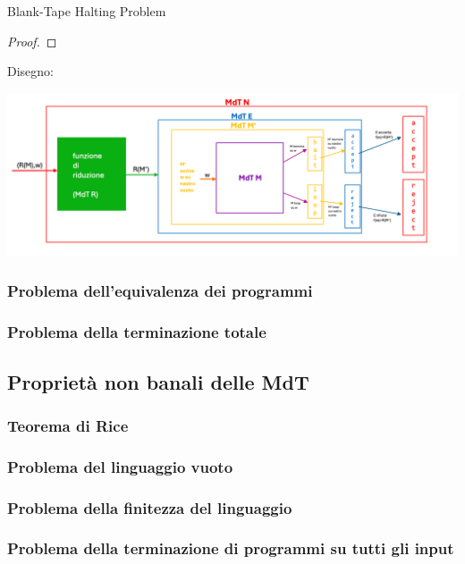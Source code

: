 \documentclass{article}  %
\theoremstyle{definition}
\begin{document}
\begin{theorem}{Blank-Tape Halting Problem}
\begin{proof}
  \end{proof}
  Disegno: \\
    \begin{center}
    \includegraphics[width=0.9\linewidth]{BTHP.png}
  \end{center}
\end{theorem}











\subsubsection{Problema dell'equivalenza dei programmi}
\subsubsection{Problema della terminazione totale}

\subsection{Proprietà non banali delle MdT}
\subsubsection{Teorema di Rice}
\subsubsection{Problema del linguaggio vuoto}
\subsubsection{Problema della finitezza del linguaggio}
\subsubsection{Problema della terminazione di programmi su tutti gli input}

\break
\end{document}
